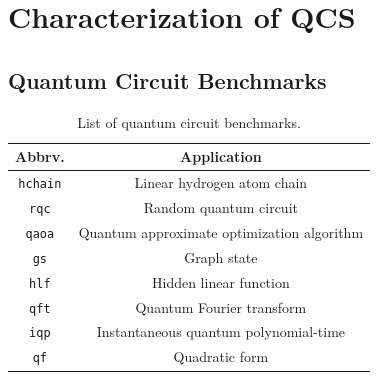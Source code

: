 \section{Characterization of QCS}

\subsection{Quantum Circuit Benchmarks}
\label{sec:bench}
\begin{table}[t!]
    \centering
        \caption{List of quantum circuit benchmarks.}
    \begin{tabular}{||c|c||}
        \hline
        {\bf Abbrv.} & {\bf Application} \\
        [0.5ex] 
        \hline\hline
        {\tt hchain} & Linear hydrogen atom chain \cite{10.1021/acs.jctc.9b01125} \\
        \hline
        {\tt rqc} & Random quantum circuit \cite{10.1038/s41567-018-0124-x} \\
        \hline
        {\tt qaoa} & Quantum approximate optimization algorithm \cite{10.48550/arXiv.1411.4028}  \\
        \hline
        {\tt gs} & Graph state \cite{10.26421/QIC17.3-4-5,10.3254/978-1-61499-018-5-115} \\
        \hline
        {\tt hlf} & Hidden linear function \cite{10.1126/science.aar3106} \\
        \hline
        {\tt qft} & Quantum Fourier transform \cite{10.1016/j.parco.2014.12.001} \\
        \hline
        {\tt iqp} & Instantaneous quantum polynomial-time \cite{10.1098/rspa.2010.0301,10.1103/PhysRevLett.117.080501} \\
        \hline
        {\tt qf} & Quadratic form \cite{10.22331/q-2021-04-08-428} \\
        \hline
    \end{tabular}
    \label{tab:list-bench}
\end{table}

